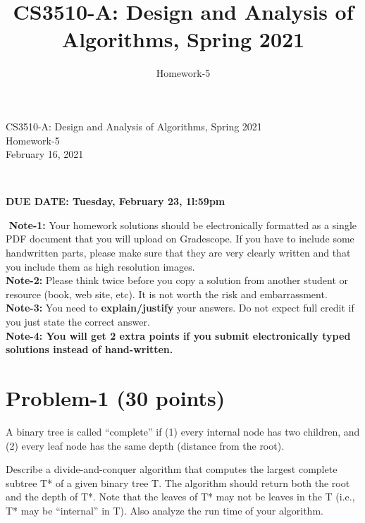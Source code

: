 \documentclass[11pt]{article}
\title{CS3510-A: Design and Analysis of Algorithms, Spring 2021}
\author{Homework-5}
\begin{document}
\begin{center}
    
    \LARGE CS3510-A: Design and Analysis of Algorithms, Spring 2021 \\ \vspace{1em} 
    \large Homework-5 \\ \vspace{0.5em}
    February 16, 2021
\end{center}
\thispagestyle{empty}
\pagestyle{empty}
​
\noindent
\begin{center}
{\bf DUE DATE: Tuesday, February 23, 1l:59pm}
\end{center}
​
\noindent
{\bf Note-1:} Your homework solutions should be electronically formatted as a single PDF document that you will upload on Gradescope. 
If you have to include some handwritten parts, please make sure that they are very clearly written and that you include them as high resolution images. \\
​
\noindent
{\bf Note-2:} Please think twice before you copy a solution from another student or resource (book, web site, etc). 
It is not worth the risk and embarrassment. \\
​
\noindent
{\bf Note-3:} You need to {\bf explain/justify} your answers. Do not expect full credit if you just state the correct answer. \\
​
\noindent
{\bf Note-4: You will get 2 extra points if you submit electronically typed solutions instead of hand-written.} 
​
\newpage
\section*{Problem-1 (30 points)}
A binary tree is called “complete” if (1) every internal node has two children, and (2) every leaf node has the same depth (distance from the root). 


Describe a divide-and-conquer algorithm that computes the largest complete subtree T* of a given binary tree T. The algorithm should return both the root and the depth of T*. Note that the leaves of T* may not be leaves in the T (i.e., T* may be “internal” in T).
Also analyze the run time of your algorithm.
\end{document}
